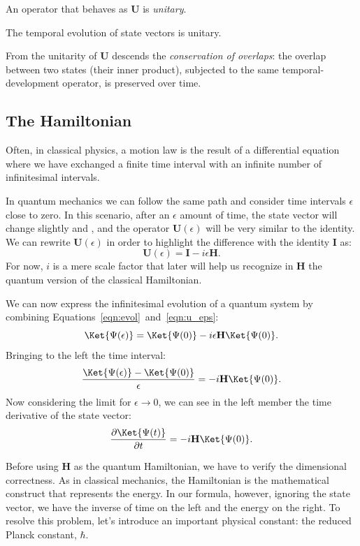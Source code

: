 An operator that behaves as $\mathbf{U}$ is \emph{unitary}.
\begin{principles}
	The temporal evolution of state vectors is unitary. 
\end{principles}

From the unitarity of $\mathbf{U}$ descends the \emph{conservation of overlaps}: the overlap between two states (their inner product), subjected to the same temporal-development operator, is preserved over time.

\subsection{The Hamiltonian}
\label{sec:hamiltonian}
Often, in classical physics, a motion law is the result of a differential equation where we have exchanged a finite time interval with an infinite number of infinitesimal intervals. 

In quantum mechanics we can follow the same path and consider time intervals $\epsilon$ close to zero. In this scenario, after an $\epsilon$ amount of time, the state vector will change slightly and , and the operator $\mathbf{U}(\epsilon)$ will be very similar to the identity. We can rewrite $\mathbf{U}(\epsilon)$ in order to highlight the difference with the identity $\mathbf{I}$ as:
\begin{equation}
	\label{eqn:u_eps}
	\mathbf{U}(\epsilon) = \mathbf{I} - i\epsilon \mathbf{H}.
\end{equation}
For now, $i$ is a mere scale factor that later will help us recognize in $\mathbf{H}$ the quantum version of the classical Hamiltonian.

We can now express the infinitesimal evolution of a quantum system by combining Equations~\ref{eqn:evol}~and~\ref{eqn:u_eps}:
\[
\Ket{\Psi(\epsilon)} = \Ket{\Psi(0)} - i \epsilon\mathbf{H}\Ket{\Psi(0)}.
\]
Bringing to the left the time interval:
\[
\frac{\Ket{\Psi(\epsilon)} - \Ket{\Psi(0)}}{\epsilon} =  - i\mathbf{H}\Ket{\Psi(0)}.
\]
Now considering the limit for $\epsilon \to 0$, we can see in the left member the time derivative of the state vector:
\[
\frac{\partial\Ket{\Psi(t)}}{\partial t} = - i \mathbf{H}\Ket{\Psi(0)}.
\]

Before using $\mathbf{H}$ as the quantum Hamiltonian, we have to verify the dimensional correctness. As in classical mechanics, the Hamiltonian is the mathematical construct that represents the energy. In our formula, however, ignoring the state vector, we have the inverse of time on the left and the energy on the right. To resolve this problem, let's introduce an important physical constant: the reduced Planck constant, $\hbar$.

